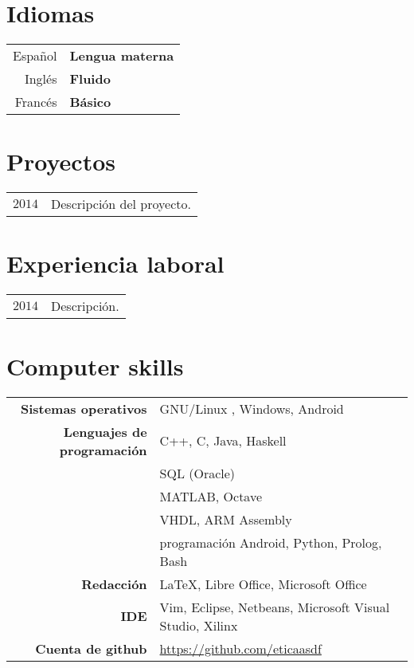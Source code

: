 \documentclass[11pt]{article}
\begin{document}
\section*{Idiomas}

\begin{tabular}{r l}
Español & \textbf{Lengua materna} \\
Inglés & \textbf{Fluido} \\
Francés & \textbf{Básico}

\end{tabular}

\section*{Proyectos}
\begin{tabular}{r p{14cm}}
$2014$ & Descripción del proyecto.
\\
\end{tabular}

\section*{Experiencia laboral}
\begin{tabular}{r p{14cm}}
$2014$ & Descripción.
\\
\end{tabular}

\section*{Computer skills}

\begin{tabular}{r l}
\textbf{Sistemas operativos} & GNU/Linux , Windows, Android \\

\textbf{Lenguajes de programación} 	& C++, C, Java, Haskell\\
								& SQL (Oracle)\\
								& MATLAB, Octave\\
								& VHDL, ARM Assembly\\
								& programación Android, Python, Prolog, Bash \\

\textbf{Redacción}			& LaTeX, Libre Office, Microsoft Office\\

\textbf{IDE}					& Vim, Eclipse, Netbeans, Microsoft Visual Studio, Xilinx \\


\textbf{Cuenta de github}				& \url{https://github.com/eticaasdf}\\
\end{tabular}
\end{document}
